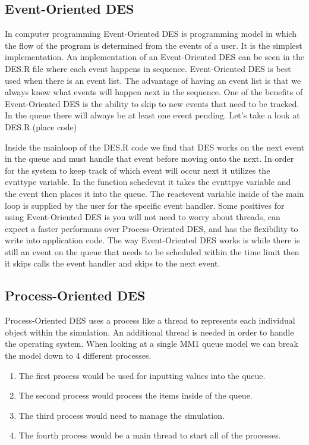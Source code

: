 \documentclass[a4paper]{article}
\begin{document}
\subsection{Event-Oriented DES}

In computer programming Event-Oriented DES is programming model in which the flow of the program is determined from the events of a user. It is the simplest implementation. An implementation of an Event-Oriented DES can be seen in the DES.R file where each event happens in sequence. Event-Oriented DES is best used when there is an event list. The advantage of having an event list is that we always know what events will happen next in the sequence. One of the benefits of Event-Oriented DES is the ability to skip to new events that need to be tracked. In the queue there will always be at least one event pending. 
    Let’s take a look at DES.R (place code)
	\\
    \par Inside the mainloop of the DES.R code we find that DES works on the next event in the queue and must handle that event before moving onto the next. In order for the system to keep track of which event will occur next it utilizes the evnttype variable. In the function schedevnt  it takes the evnttpye variable and the event then places it into the queue. The reactevent variable inside of the main loop is supplied by the user  for the specific event handler.
Some positives for using Event-Oriented DES is you will not need to worry about threads, can expect a faster performans over Process-Oriented DES, and has the flexibility to write into application code. The way Event-Oriented DES works is while there is still an event on the queue that needs to be scheduled within the time limit then it skips calls the event handler and skips to the next event.



\subsection{Process-Oriented DES}

Process-Oriented DES uses a process like a thread to represents each individual object within the simulation. An additional thread is needed in order to handle the operating system. When looking at a single MM1 queue model we can break the model down to 4 different processes. 

\begin{enumerate}
	\item The first process would be used for inputting values into the queue.
	\item The second process would process the items inside of the queue.
	\item The third process would need to manage the simulation.
	\item The fourth process would be a main thread to start all of the processes.
\end{enumerate}
\end{document}
